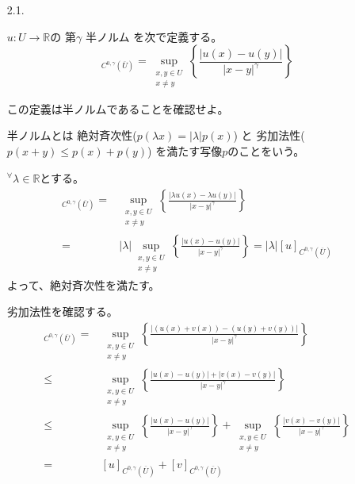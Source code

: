 \documentclass[12pt,b5paper]{ltjsarticle}
\begin{document}
\begin{enumerate}
 \item [2.1.]

       $u:U\to\mathbb{R}$の
       第$\gamma$  半ノルム
       を次で定義する。
       \begin{equation}
        [u]_{C^{0,\gamma}(\overline{U})}
          =
          \sup_{\substack{x,y\in U \\ x \ne y}}
          \left\{
           \frac{\lvert u(x)-u(y) \rvert}{\lvert x-y \rvert^{\gamma}}
          \right\}
       \end{equation}

       この定義は半ノルムであることを確認せよ。

       \dotfill

       半ノルムとは
       絶対斉次性($p(\lambda x) = \lvert \lambda \rvert p(x)$)
       と
       劣加法性($p(x+y)\leq p(x)+p(y)$)
       を満たす写像$p$のことをいう。

       ${}^{\forall}\lambda \in \mathbb{R}$とする。
       \begin{align}
        [\lambda u]_{C^{0,\gamma}(\overline{U})}
         =&
          \sup_{\substack{x,y\in U \\ x \ne y}}
          \left\{
           \frac{\lvert \lambda u(x)- \lambda u(y) \rvert}{\lvert x-y \rvert^{\gamma}}
          \right\}\\
          =&
          \lvert \lambda \rvert \sup_{\substack{x,y\in U \\ x \ne y}}
          \left\{
           \frac{\lvert u(x)- u(y) \rvert}{\lvert x-y \rvert^{\gamma}}
          \right\}
          =
          \lvert \lambda \rvert [u]_{C^{0,\gamma}(\overline{U})}
       \end{align}
       よって、絶対斉次性を満たす。

       劣加法性を確認する。
       \begin{align}
        [u+v]_{C^{0,\gamma}(\overline{U})}
         =&
          \sup_{\substack{x,y\in U \\ x \ne y}}
          \left\{
           \frac{\lvert (u(x)+v(x))- (u(y)+v(y)) \rvert}{\lvert x-y \rvert^{\gamma}}
          \right\}\\
          \leq &
          \sup_{\substack{x,y\in U \\ x \ne y}}
          \left\{
           \frac{\lvert u(x)- u(y) \rvert + \lvert v(x)-v(y) \rvert}{\lvert x-y \rvert^{\gamma}}
          \right\}\\
          \leq &
          \sup_{\substack{x,y\in U \\ x \ne y}}
          \left\{
           \frac{\lvert u(x)- u(y) \rvert}{\lvert x-y \rvert^{\gamma}}
          \right\}
        +
          \sup_{\substack{x,y\in U \\ x \ne y}}
          \left\{
           \frac{ \lvert v(x)-v(y) \rvert}{\lvert x-y \rvert^{\gamma}}
          \right\}\\
        =&
        [u]_{C^{0,\gamma}(\overline{U})}
        +
        [v]_{C^{0,\gamma}(\overline{U})}
       \end{align}


\end{enumerate}
\end{document}
